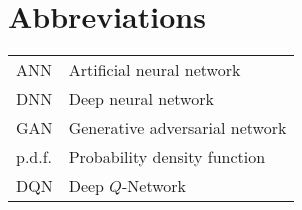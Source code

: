 \documentclass[../main.tex]{subfiles}
\begin{document}
\section*{Abbreviations}

\begin{longtable}[l]{ l l }
    ANN & Artificial neural network \\
    DNN & Deep neural network \\
    GAN & Generative adversarial network \\
    p.d.f. & Probability density function \\
    DQN & Deep $Q$-Network \\
\end{longtable}
\end{document}
